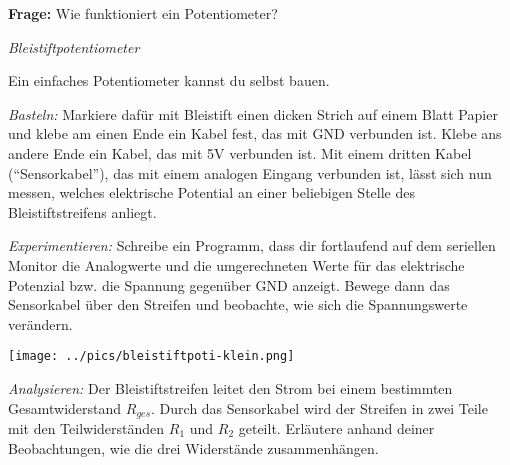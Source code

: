 \documentclass[ngerman, 11pt]{scrreprt}
\begin{document}
	
	\begin{ziel}
		\textbf{Frage:} Wie funktioniert ein Potentiometer?
	\end{ziel}
	
	\begin{aufgabe*}\emph{Bleistiftpotentiometer}
		\par
		\begin{minipage}{0.6\textwidth}
			\smallskip
			Ein einfaches Potentiometer kannst du selbst bauen. 
			
			\bigskip
			\emph{Basteln:} Markiere dafür mit Bleistift einen dicken Strich auf einem Blatt Papier und klebe am einen Ende ein Kabel fest, das mit GND verbunden ist. Klebe ans andere Ende ein Kabel, das mit 5V verbunden ist. Mit einem dritten Kabel (\enquote{Sensorkabel}), das mit einem analogen Eingang verbunden ist, lässt sich nun messen, welches elektrische Potential an einer beliebigen Stelle des Bleistiftstreifens anliegt.
			
			\bigskip
			\emph{Experimentieren:}	Schreibe ein Programm, dass dir fortlaufend auf dem seriellen Monitor die Analogwerte und die umgerechneten Werte für das elektrische Potenzial bzw. die Spannung gegenüber GND anzeigt. Bewege dann das Sensorkabel über den Streifen und beobachte, wie sich die Spannungswerte verändern.
		\end{minipage}
		\hfill
		\begin{minipage}{0.39\textwidth}
			\centering
			\texttt{[image: ../pics/bleistiftpoti-klein.png]}
		\end{minipage}
		\par
		\bigskip
		\emph{Analysieren:}	Der Bleistiftstreifen leitet den Strom bei einem bestimmten Gesamtwiderstand $R_{ges}$. Durch das Sensorkabel wird der Streifen in zwei Teile mit den Teilwiderständen $R_1$ und $R_2$ geteilt. Erläutere anhand deiner Beobachtungen, wie die drei Widerstände zusammenhängen.
	\end{aufgabe*}
\end{document}
